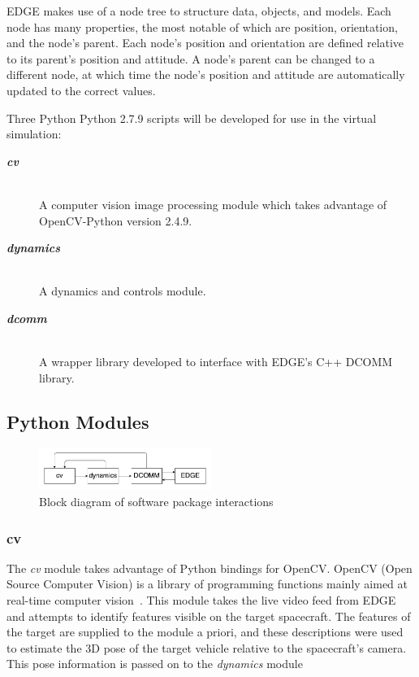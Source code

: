 \documentclass[journal, 10pt]{IEEEtran}
\begin{document}
EDGE makes use of a node tree to structure data, objects, and models. Each node has many properties, the most notable of which are position, orientation, and the node's parent. Each node's position and orientation are defined relative to its parent's position and attitude. A node's parent can be changed to a different node, at which time the node's position and attitude are automatically updated to the correct values.

Three Python Python 2.7.9 scripts will be developed for use in the virtual simulation:
\begin{description}
    \item[\textbf{\textit{cv}}] \hfill \\
    A computer vision image processing module which takes advantage of OpenCV-Python version 2.4.9.
    \item[\textbf{\textit{dynamics}}] \hfill \\
    A dynamics and controls module.
    \item[\textbf{\textit{dcomm}}] \hfill \\
    A wrapper library developed to interface with EDGE's C++ DCOMM library.
\end{description}

\subsection{Python Modules}
\begin{figure}[b]
\begin{center}
\includegraphics[width=0.5\textwidth]{figures/block.pdf}
\caption{Block diagram of software package interactions}
\label{block_diagram}
\end{center}
\end{figure}

\subsubsection{cv}
The \textit{cv} module takes advantage of Python bindings for OpenCV. OpenCV (Open Source Computer Vision) is a library of programming functions mainly aimed at real-time computer vision~\cite{opencv}. This module takes the live video feed from EDGE and attempts to identify features visible on the target spacecraft. The features of the target are supplied to the module a priori, and these descriptions were used to estimate the 3D pose of the target vehicle relative to the spacecraft's camera. This pose information is passed on to the \textit{dynamics} module
\end{document}
